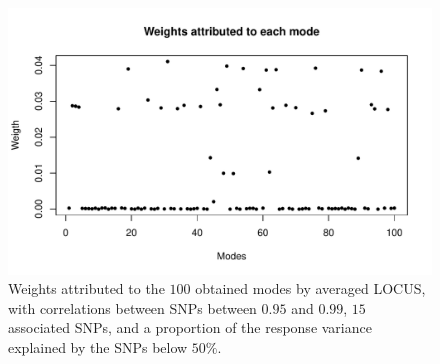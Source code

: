 \documentclass[a4paper, 11pt]{report}
\numberwithin{equation}{chapter}
\begin{document}
\begin{figure}[h!]
\centering
\includegraphics[width=5in]{images/WeightsMode.pdf}
\caption{\label{fig:weightsModes}Weights attributed to the $100$ obtained modes by averaged LOCUS, with correlations between SNPs between $0.95$ and $0.99$, $15$ associated SNPs, and a proportion of the response variance explained by the SNPs below $50\%$.}
\end{figure}
\end{document}
